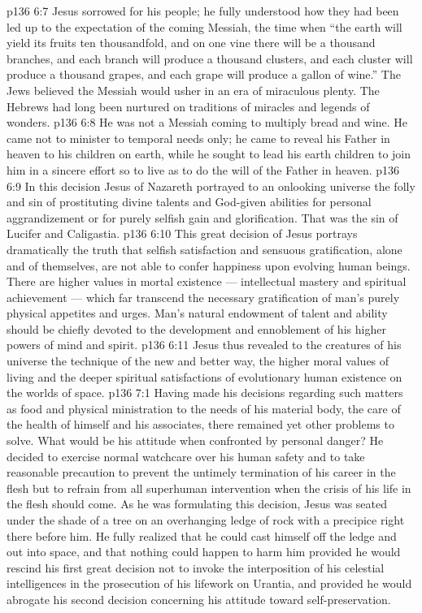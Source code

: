\vs p136 6:7 Jesus sorrowed for his people; he fully understood how they had been led up to the expectation of the coming Messiah, the time when “the earth will yield its fruits ten thousandfold, and on one vine there will be a thousand branches, and each branch will produce a thousand clusters, and each cluster will produce a thousand grapes, and each grape will produce a gallon of wine.” The Jews believed the Messiah would usher in an era of miraculous plenty. The Hebrews had long been nurtured on traditions of miracles and legends of wonders.
\vs p136 6:8 He was not a Messiah coming to multiply bread and wine. He came not to minister to temporal needs only; he came to reveal his Father in heaven to his children on earth, while he sought to lead his earth children to join him in a sincere effort so to live as to do the will of the Father in heaven.
\vs p136 6:9 \pc In this decision Jesus of Nazareth portrayed to an onlooking universe the folly and sin of prostituting divine talents and God\hyp{}given abilities for personal aggrandizement or for purely selfish gain and glorification. That was the sin of Lucifer and Caligastia.
\vs p136 6:10 This great decision of Jesus portrays dramatically the truth that selfish satisfaction and sensuous gratification, alone and of themselves, are not able to confer happiness upon evolving human beings. There are higher values in mortal existence --- intellectual mastery and spiritual achievement --- which far transcend the necessary gratification of man’s purely physical appetites and urges. Man’s natural endowment of talent and ability should be chiefly devoted to the development and ennoblement of his higher powers of mind and spirit.
\vs p136 6:11 Jesus thus revealed to the creatures of his universe the technique of the new and better way, the higher moral values of living and the deeper spiritual satisfactions of evolutionary human existence on the worlds of space.
\vs p136 7:1 Having made his decisions regarding such matters as food and physical ministration to the needs of his material body, the care of the health of himself and his associates, there remained yet other problems to solve. What would be his attitude when confronted by personal danger? He decided to exercise normal watchcare over his human safety and to take reasonable precaution to prevent the untimely termination of his career in the flesh but to refrain from all superhuman intervention when the crisis of his life in the flesh should come. As he was formulating this decision, Jesus was seated under the shade of a tree on an overhanging ledge of rock with a precipice right there before him. He fully realized that he could cast himself off the ledge and out into space, and that nothing could happen to harm him provided he would rescind his first great decision not to invoke the interposition of his celestial intelligences in the prosecution of his lifework on Urantia, and provided he would abrogate his second decision concerning his attitude toward self\hyp{}preservation.

